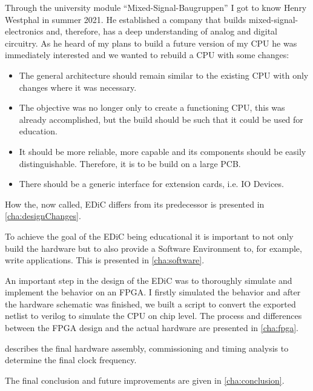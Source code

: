 Through the university module ``Mixed-Signal-Baugruppen'' I got to know Henry Westphal in summer 2021.
He established a company that builds mixed-signal-electronics and, therefore, has a deep understanding of analog and digital circuitry.
As he heard of my plans to build a future version of my \gls{CPU} he was immediately interested and we wanted to rebuild a \gls{CPU} with some changes:
\begin{itemize}
  \item The general architecture should remain similar to the existing \gls{CPU} with only changes where it was necessary.
  \item The objective was no longer only to create a functioning \gls{CPU}, this was already accomplished, but the build should be such that it could be used for education.
  \item It should be more reliable, more capable and its components should be easily distinguishable. Therefore, it is to be build on a large \gls{PCB}.
  \item There should be a generic interface for extension cards, i.e. IO Devices.
\end{itemize}
How the, now called, \gls{EDiC} differs from its predecessor is presented in \cref{cha:designChanges}.

To achieve the goal of the \gls{EDiC} being educational it is important to not only build the hardware but to also provide a Software Environment to, for example, write applications.
This is presented in \cref{cha:software}.

An important step in the design of the \gls{EDiC} was to thoroughly simulate and implement the behavior on an \gls{FPGA}.
I firstly simulated the behavior and after the hardware schematic was finished, we built a script to convert the exported netlist to verilog to simulate the \gls{CPU} on chip level.
The process and differences between the \gls{FPGA} design and the actual hardware are presented in \cref{cha:fpga}.

 describes the final hardware assembly, commissioning and timing analysis to determine the final clock frequency.

The final conclusion and future improvements are given in \cref{cha:conclusion}.